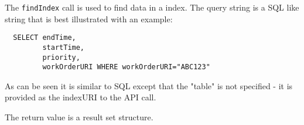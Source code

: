 The \verb+findIndex+ call is used to find data in a \Rapture index. The query string is a SQL like
string that is best illustrated with an example:

\begin{Verbatim}
  SELECT endTime,
         startTime,
         priority,
         workOrderURI WHERE workOrderURI="ABC123"
\end{Verbatim}

As can be seen it is similar to SQL except that the "table" is not specified - it is provided
as the indexURI to the API call.

The return value is a result set structure.
